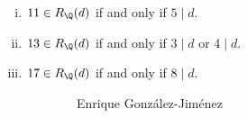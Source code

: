 \begin{frame}[plain]
\begin{prop} \hfill
	\begin{enumerate}[(i)]
	\item $11 \in R_\Q(d)$ if and only if $5 \mid d$.
	\item $13 \in R_\Q(d)$ if and only if $3 \mid d$ or $4 \mid d$. 
	\item $17 \in R_\Q(d)$ if and only if $8 \mid d$.
	\end{enumerate}
\end{prop}
	\begin{figure}[h]
	\centering
	\begin{subfigure}{0.35\textwidth}
	\captionsetup{labelformat=empty}
	\centering
	\caption{Enrique Gonz\'alez-Jim\'enez}
	\end{subfigure}
	\begin{subfigure}{0.3\textwidth}
	\captionsetup{labelformat=empty}
	\centering

\end{subfigure}
\end{figure}
\end{frame}
